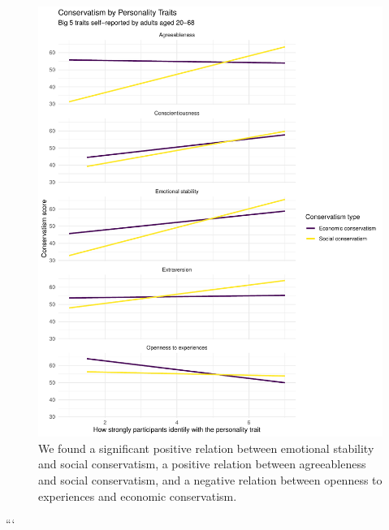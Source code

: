 \documentclass[man]{apa6}
\begin{document}
\begin{figure}
\centering
\includegraphics{manuscript_files/figure-latex/figure2-1.pdf}
\caption{\label{fig:figure2}We found a significant positive relation between
emotional stability and social conservatism, a positive relation between
agreeableness and social conservatism, and a negative relation between
openness to experiences and economic conservatism.}
\end{figure}

```

\endgroup
\end{document}
